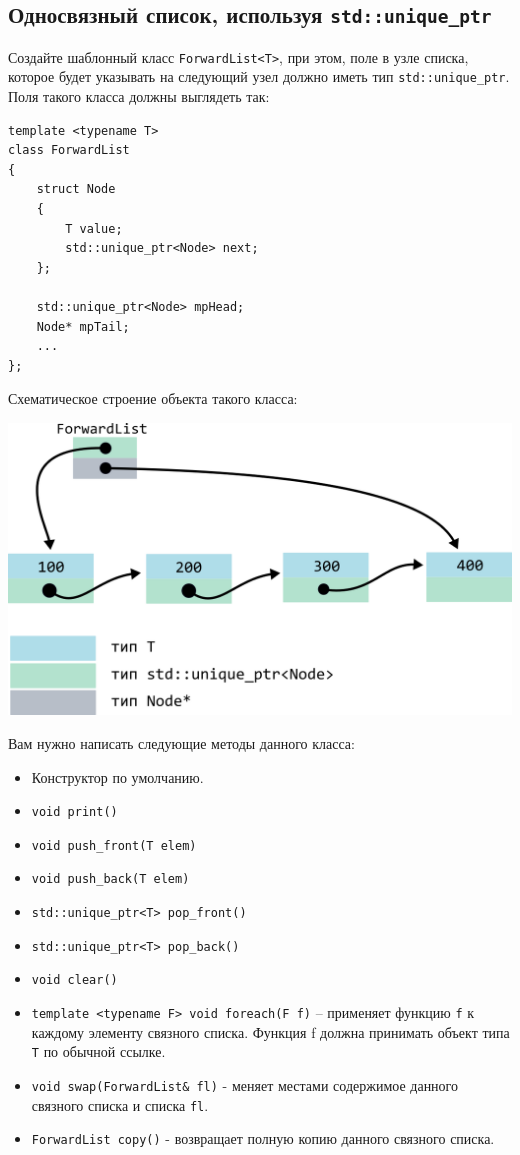 \documentclass{article}
\begin{document}
\subsection{Односвязный список, используя \texttt{std::unique\_ptr}}
Создайте шаблонный класс \texttt{ForwardList<T>}, при этом, поле в узле списка, которое будет указывать на следующий узел должно иметь тип \texttt{std::unique\_ptr}. Поля такого класса должны выглядеть так:

\begin{lstlisting}
template <typename T>
class ForwardList
{
    struct Node
    {
        T value;
        std::unique_ptr<Node> next;
    };
    
    std::unique_ptr<Node> mpHead;
    Node* mpTail;
	...
};
\end{lstlisting}

Схематическое строение объекта такого класса:

\begin{center}
\includegraphics[scale=1]{../images/forward_list_unique.png}
\end{center}

Вам нужно написать следующие методы данного класса:

\begin{itemize}
\item Конструктор по умолчанию.
\item \texttt{void print()}
\item \texttt{void push\_front(T elem)}
\item \texttt{void push\_back(T elem)}
\item \texttt{std::unique\_ptr<T> pop\_front()}
\item \texttt{std::unique\_ptr<T> pop\_back()}
\item \texttt{void clear()}
\item \texttt{template <typename F> void foreach(F f)} -- применяет функцию \texttt{f} к каждому элементу связного списка. Функция f должна принимать объект типа \texttt{T} по обычной ссылке.


\item \texttt{void swap(ForwardList\& fl)} - меняет местами содержимое данного связного списка и списка \texttt{fl}.
\item \texttt{ForwardList copy()} - возвращает полную копию данного связного списка.
\end{itemize}
\end{document}
